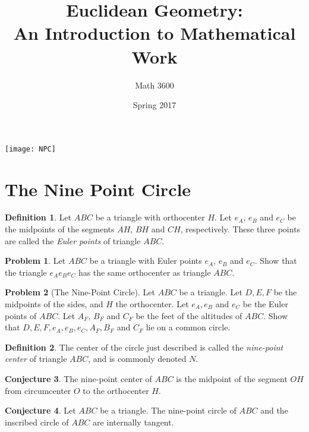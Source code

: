 \documentclass{tufte-handout}
\title{Euclidean Geometry:\\An Introduction to Mathematical Work}
\author[]{Math 3600}
\date{Spring 2017}
\theoremstyle{definition}
\newtheorem{problem}{Problem}[section]
\newtheorem{conjecture}[problem]{Conjecture}
\newtheorem*{definition}{Definition}
\begin{document}
\maketitle

\begin{marginfigure}
    \texttt{[image: NPC]}
\end{marginfigure}

\setcounter{section}{18}
\section{The Nine Point Circle}


\begin{definition} Let $ABC$ be a triangle with orthocenter $H$. Let $e_A$, $e_B$ and $e_C$ be the midpoints of the segments $AH$, $BH$ and $CH$, respectively. These three points are called the \emph{Euler points} of triangle $ABC$.
\end{definition}

\begin{problem} Let $ABC$ be a triangle with Euler points $e_A$, $e_B$ and $e_C$. Show that the triangle $e_A e_B e_C$ has the same orthocenter as triangle $ABC$.
\end{problem}

\begin{problem}[The Nine-Point Circle]\label{prob:nine-pt-circle}
Let $ABC$ be a triangle. Let $D, E, F$ be the midpoints of the sides, and $H$ the orthocenter. Let $e_A, e_B$ and $e_C$ be the Euler points of $ABC$. Let $A_F$, $B_F$ and $C_F$ be the feet of the altitudes of $ABC$. Show that $D, E, F, e_A, e_B, e_C, A_F, B_F$ and $C_F$ lie on a common circle.
\end{problem}



\begin{definition} The center of the circle just described is called the \emph{nine-point center} of triangle $ABC$, and is commonly denoted $N$.
\end{definition}

\begin{conjecture} The nine-point center of $ABC$ is the midpoint of the segment $OH$ from circumcenter $O$ to the orthocenter $H$.
\end{conjecture}

\begin{conjecture} Let $ABC$ be a triangle. The nine-point circle of $ABC$ and the inscribed circle of $ABC$ are internally tangent.
\end{conjecture}

\vfill
\end{document}
